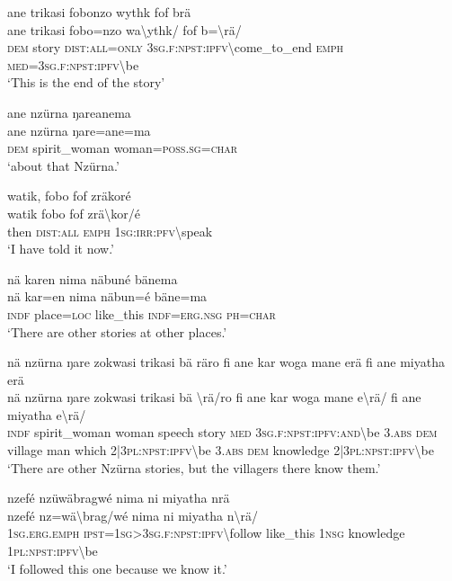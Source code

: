 \newpage
\ea\label{ex:7:a4883}
ane trikasi fobonzo wythk fof brä\\
\gll ane	trikasi	fobo=nzo	wa{\textbackslash}ythk/	fof	b={\textbackslash}rä/\\
     \textsc{dem}	story	\textsc{dist}:\textsc{all}=\textsc{only}	3\textsc{sg}.\textsc{f}:\textsc{npst}:\textsc{ipfv}{\textbackslash}come\_to\_end	\textsc{emph}	\textsc{med}=3\textsc{sg}.\textsc{f}:\textsc{npst}:\textsc{ipfv}{\textbackslash}be\\
\glt `This is the end of the story'
\z

\ea\label{ex:7:a4884}
ane nzürna ŋareanema\\
\gll ane	nzürna	ŋare=ane=ma\\
     \textsc{dem}	spirit\_woman	woman=\textsc{poss}.\textsc{sg}=\textsc{char}\\
\glt `about that Nzürna.'
\z

\ea\label{ex:7:a4885}
watik, fobo fof zräkoré\\
\gll watik	fobo	fof	zrä{\textbackslash}kor/é\\
     then	\textsc{dist}:\textsc{all}	\textsc{emph}	1\textsc{sg}:\textsc{irr}:\textsc{pfv}{\textbackslash}speak\\
\glt `I have told it now.'
\z

\ea\label{ex:7:a4886}
nä karen nima näbuné bänema\\
\gll nä	kar=en	nima	näbun=é	bäne=ma\\
     \textsc{indf}	place=\textsc{loc}	like\_this	\textsc{indf}=\textsc{erg}.\textsc{nsg}	\textsc{ph}=\textsc{char}\\
\glt `There are other stories at other places.'
\z

\ea\label{ex:7:a4887}
nä nzürna ŋare zokwasi trikasi bä räro fi ane  kar woga mane erä fi ane miyatha erä\\
\gll nä	nzürna	ŋare	zokwasi	trikasi	bä	{\textbackslash}rä/ro	fi	ane	kar	woga	mane	e{\textbackslash}rä/	fi	ane	miyatha	e{\textbackslash}rä/\\
     \textsc{indf}	spirit\_woman	woman	speech	story	\textsc{med}	3\textsc{sg}.\textsc{f}:\textsc{npst}:\textsc{ipfv}:\textsc{and}{\textbackslash}be	3.\textsc{abs}	\textsc{dem}	village	man	which	2|3\textsc{pl}:\textsc{npst}:\textsc{ipfv}{\textbackslash}be	3.\textsc{abs}	\textsc{dem}	knowledge	2|3\textsc{pl}:\textsc{npst}:\textsc{ipfv}{\textbackslash}be\\
\glt `There are other Nzürna stories, but the villagers there know them.'
\z

\ea\label{ex:7:a4889}
nzefé nzüwäbragwé nima ni miyatha nrä\\
\gll nzefé	nz=wä{\textbackslash}brag/wé	nima	ni	miyatha	n{\textbackslash}rä/\\
     1\textsc{sg}.\textsc{erg}.\textsc{emph}	\textsc{ipst}=1\textsc{sg}>3\textsc{sg}.\textsc{f}:\textsc{npst}:\textsc{ipfv}{\textbackslash}follow	like\_this	1\textsc{nsg}	knowledge	1\textsc{pl}:\textsc{npst}:\textsc{ipfv}{\textbackslash}be\\
\glt `I followed this one because we know it.'
\z

